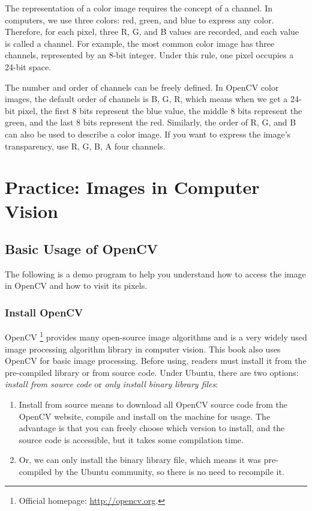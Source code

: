 The representation of a color image requires the concept of a channel. In computers, we use three colors: red, green, and blue to express any color. Therefore, for each pixel, three R, G, and B values are recorded, and each value is called a channel. For example, the most common color image has three channels, represented by an 8-bit integer. Under this rule, one pixel occupies a 24-bit space.

The number and order of channels can be freely defined. In OpenCV color images, the default order of channels is B, G, R, which means when we get a 24-bit pixel, the first 8 bits represent the blue value, the middle 8 bits represent the green, and the last 8 bits represent the red. Similarly, the order of R, G, and B can also be used to describe a color image. If you want to express the image's transparency, use R, G, B, A four channels.

\section{Practice: Images in Computer Vision}
\subsection{Basic Usage of OpenCV}
The following is a demo program to help you understand how to access the image in OpenCV and how to visit its pixels.

\subsubsection{Install OpenCV}
OpenCV \footnote {Official homepage: \url{http://opencv.org}. } provides many open-source image algorithms and is a very widely used image processing algorithm library in computer vision. This book also uses OpenCV for basic image processing. Before using, readers must install it from the pre-compiled library or from source code. Under Ubuntu, there are two options: \textit{install from source code} or \textit {only install binary library files}:

\begin{enumerate}
\item Install from source means to download all OpenCV source code from the OpenCV website, compile and install on the machine for usage. The advantage is that you can freely choose which version to install, and the source code is accessible, but it takes some compilation time.
\item Or, we can only install the binary library file, which means it was pre-compiled by the Ubuntu community, so there is no need to recompile it.
\end{enumerate}

